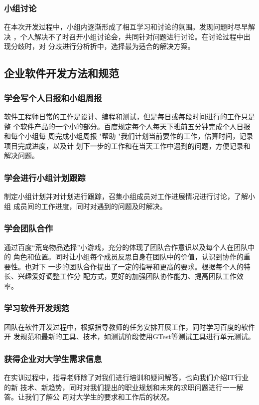 \documentclass[12pt, a4paper, titlepage]{article}
\begin{document}
\subsubsection{小组讨论}
\par{在本次开发过程中，小组内逐渐形成了相互学习和讨论的氛围。发现问题时尽早解决
，个人解决不了时召开小组讨论会，共同针对问题进行讨论。在讨论过程中出现分歧时，对
分歧进行分析折中，选择最为适合的解决方案。}

\subsection{企业软件开发方法和规范}
\subsubsection{学会写个人日报和小组周报}
\par{软件工程师日常的工作是设计、编程和测试，但是每日或每段时间进行的工作只是整
个软件产品的一个小的部分。百度规定每个人每天下班前五分钟完成个人日报和每个小组每
周完成小组周报 "帮助 "我们计划当前要作的工作，估算时间，记录项目完成进度，以及计
划下一步的工作和在当天工作中遇到的问题，方便记录和解决问题。}
\subsubsection{学会进行小组计划跟踪}
\par{制定小组计划并对计划进行跟踪，召集小组成员对工作进展情况进行讨论，了解小组
成员间的工作进度，同时对遇到的问题及时解决。}
\subsubsection{学会团队合作}
\par{通过百度“荒岛物品选择”小游戏，充分的体现了团队合作意识以及每个人在团队中的
角色和位置。同时让小组每个成员反思自身在团队中的价值，认识到协作的重要性。也对下
一步的团队合作提出了一定的指导和更高的要求。根据每个人的特长、兴趣爱好调整工作分
配方式，更好的加强团队协作能力、提高团队工作效率。}
\subsubsection{学习软件开发规范}
\par{ 团队在软件开发过程中，根据指导教师的任务安排开展工作，同时学习百度的软件开
发规范和最新的工具、技术，如测试阶段使用GTest等测试工具进行单元测试。}
\subsubsection{获得企业对大学生需求信息}
\par{在实训过程中，指导老师除了对我们进行培训和疑问解答，也向我们介绍IT行业的新
技术、新趋势，同时对我们提出的职业规划和未来的求职问题进行一一解答。让我们了解公
司对大学生的要求和工作后的状况。}
\end{document}
